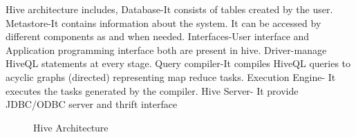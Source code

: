 \documentclass[9pt,twocolumn,twoside]{../../styles/osajnl}
\begin{document}

Hive architecture includes,
Database-It consists of tables created by the user.
Metastore-It contains information about the system. It can be accessed by different components as and when needed.
Interfaces-User interface and Application programming interface both are present in hive.
Driver-manage HiveQL statements at every stage.
Query compiler-It compiles HiveQL queries to acyclic graphs (directed) representing map reduce tasks.
Execution Engine- It executes the tasks generated by the compiler.
Hive Server- It provide JDBC/ODBC server and thrift interface\cite{td}

\begin{figure}[htbp]
	\centering
	\caption{Hive Architecture }
	\label{fig:Hive-arch}
\end{figure}
\end{document}
